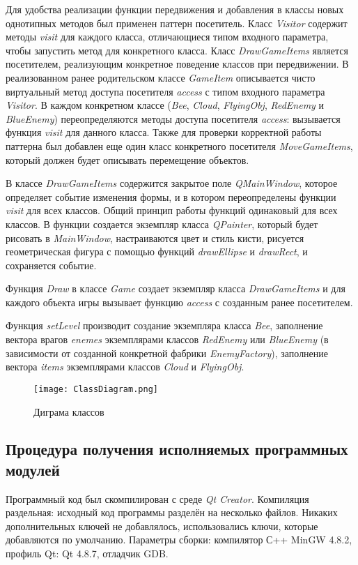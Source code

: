 \documentclass[a4paper,14pt]{article}
\begin{document}
Для удобства реализации функции передвижения и добавления в классы новых однотипных методов был применен паттерн посетитель. Класс \textit{Visitor} содержит методы \textit{visit} для каждого класса, отличающиеся типом входного параметра, чтобы запустить метод для конкретного класса. Класс \textit{DrawGameItems} является посетителем, реализующим конкретное поведение классов при передвижении. В реализованном ранее родительском классе \textit{GameItem} описывается чисто виртуальный метод доступа посетителя \textit{access} с типом входного параметра \textit{Visitor}. В каждом конкретном классе (\textit{Bee}, \textit{Cloud}, \textit{FlyingObj}, \textit{RedEnemy} и \textit{BlueEnemy}) переопределяются методы доступа посетителя \textit{access}: вызывается функция \textit{visit} для данного класса. Также для проверки корректной работы паттерна был добавлен еще один класс конкретного посетителя \textit{MoveGameItems}, который должен будет описывать перемещение объектов.

В классе \textit{DrawGameItems} содержится закрытое поле \textit{QMainWindow}, которое определяет событие изменения формы, и в котором переопределены функции \textit{visit} для всех классов. Общий принцип работы функций одинаковый для всех классов. В функции создается экземпляр класса \textit{QPainter}, который будет рисовать в \textit{MainWindow}, настраиваются цвет и стиль кисти, рисуется геометрическая фигура с помощью функций \textit{drawEllipse} и \textit{drawRect}, и сохраняется событие.

Функция \textit{Draw} в классе \textit{Game} создает экземпляр класса \textit{DrawGameItems} и для каждого объекта игры вызывает функцию \textit{access} с созданным ранее посетителем.

Функция \textit{setLevel} производит создание экземпляра класса \textit{Bee}, заполнение вектора врагов \textit{enemes} экземплярами классов \textit{RedEnemy} или \textit{BlueEnemy} (в зависимости от созданной конкретной фабрики \textit{EnemyFactory}), заполнение вектора \textit{items} экземплярами классов \textit{Cloud} и \textit{FlyingObj}.

\begin{figure}[H]
	\centering
	\texttt{[image: ClassDiagram.png]}
	\caption{Диграма классов}	
\end{figure}

\subsection{Процедура получения исполняемых программных модулей}
Программный код был скомпилирован с среде \textit{Qt Creator}. Компиляция раздельная: исходный код программы разделён на несколько файлов. Никаких дополнительных ключей не добавлялось, использовались ключи, которые добавляются по умолчанию. Параметры сборки: компилятор С++ MinGW 4.8.2, профиль Qt: Qt 4.8.7, отладчик GDB.
\end{document}
